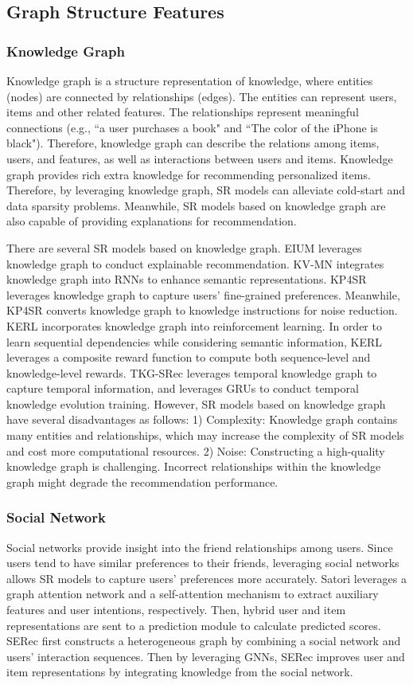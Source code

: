 \documentclass[review]{fcs}
\begin{document}
	\subsection{Graph Structure Features}
	\subsubsection{Knowledge Graph}
	Knowledge graph is a structure representation of knowledge, where entities (nodes) are connected by relationships (edges). The entities can represent users, items and other related features. The relationships represent meaningful connections (e.g., “a user purchases a book" and “The color of the iPhone is black"). Therefore, knowledge graph can describe the relations among items, users, and features, as well as interactions between users and items. Knowledge graph provides rich extra knowledge for recommending personalized items. Therefore, by leveraging knowledge graph, SR models can alleviate cold-start and data sparsity problems. Meanwhile, SR models based on knowledge graph are also capable of providing explanations for recommendation.
	
	There are several SR models based on knowledge graph. EIUM \cite{EIUM} leverages knowledge graph to conduct explainable recommendation. KV-MN \cite{KV-MN} integrates knowledge graph into RNNs to enhance semantic representations. KP4SR \cite{KP4SR} leverages knowledge graph to capture users’ fine-grained preferences. Meanwhile, KP4SR \cite{KP4SR} converts knowledge graph to knowledge instructions for noise reduction. KERL \cite{KERL} incorporates knowledge graph into reinforcement learning. In order to learn sequential dependencies while considering semantic information, KERL \cite{KERL} leverages a composite reward function to compute both sequence-level and knowledge-level rewards. TKG-SRec \cite{TKG-SRec} leverages temporal knowledge graph to capture temporal information, and leverages GRUs to conduct temporal knowledge evolution training. However, SR models based on knowledge graph have several disadvantages as follows: 1) Complexity: Knowledge graph contains many entities and relationships, which may increase the complexity of SR models and cost more computational resources. 2) Noise: Constructing a high-quality knowledge graph is challenging. Incorrect relationships within the knowledge graph might degrade the recommendation performance.
	\subsubsection{Social Network}
	Social networks provide insight into the friend relationships among users. Since users tend to have similar preferences to their friends, leveraging social networks allows SR models to capture users' preferences more accurately. Satori \cite{Satori} leverages a graph attention network and a self-attention mechanism to extract auxiliary features and user intentions, respectively. Then, hybrid user and item representations are sent to a prediction module to calculate predicted scores. SERec \cite{SERec} first constructs a heterogeneous graph by combining a social network and users' interaction sequences. Then by leveraging GNNs, SERec improves user and item representations by integrating knowledge from the social network.
\end{document}
